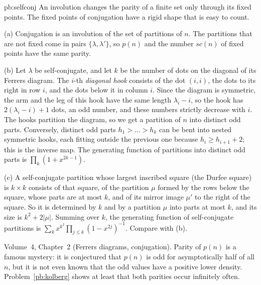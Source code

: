 \begin{solution}{pb:selfconj}
\idea An involution changes the parity of a finite set only through its fixed points. The fixed points of conjugation have a
rigid shape that is easy to count.

\writeup (a) Conjugation is an involution of the set of partitions of $n$. The partitions that are not fixed come in pairs
$\{\lambda,\lambda'\}$, so $p(n)$ and the number $sc(n)$ of fixed points have the same parity.

(b) Let $\lambda$ be self-conjugate, and let $k$ be the number of dots on the diagonal of its Ferrers diagram. The $i$-th
\emph{diagonal hook} consists of the dot $(i,i)$, the dots to its right in row $i$, and the dots below it in column $i$. Since the
diagram is symmetric, the arm and the leg of this hook have the same length $\lambda_i-i$, so the hook has $2(\lambda_i-i)+1$ dots, an
odd number, and these numbers strictly decrease with $i$. The hooks partition the diagram, so we get a partition of $n$ into
distinct odd parts. Conversely, distinct odd parts $h_1>\dots>h_k$ can be bent into nested symmetric hooks, each fitting outside
the previous one because $h_i\ge h_{i+1}+2$; this is the inverse map. The generating function of partitions into distinct odd
parts is $\prod_k(1+x^{2k-1})$.

(c) A self-conjugate partition whose largest inscribed square (the Durfee square) is $k\times k$ consists of that square,
of the partition $\mu$ formed by the rows below the square, whose parts are at most $k$, and of its mirror image $\mu'$ to the
right of the square. So it is determined by $k$ and by a partition $\mu$ into parts at most $k$, and its size is $k^2+2|\mu|$. Summing over $k$,
the generating function of self-conjugate partitions is $\sum_kx^{k^2}\prod_{j\le k}(1-x^{2j})^{-1}$. Compare with (b).

\tools Volume~4, Chapter~2 (Ferrers diagrams, conjugation).
\leads Parity of $p(n)$ is a famous mystery: it is conjectured that $p(n)$ is odd for asymptotically half of all $n$, but it is
not even known that the odd values have a positive lower density. Problem~\ref{pb:kolberg} shows at least that both parities occur
infinitely often.
\end{solution}

